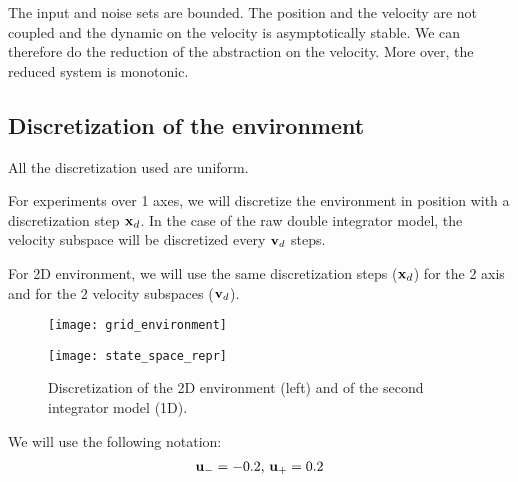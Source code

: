 The input and noise sets are bounded. The position and the velocity are not coupled and the dynamic on the velocity is asymptotically stable.
We can therefore do the reduction of the abstraction on the velocity. More over, the reduced system is monotonic.

\subsection{Discretization of the environment}
All the discretization used are uniform.

For experiments over 1 axes, we will discretize the environment in position with a discretization step $ \mathbf{x}_d$. In the case of the raw double integrator model, the velocity subspace will be discretized every $ \mathbf{v}_d$ steps.

For 2D environment, we will use the same discretization steps ($ \mathbf{x}_d$) for the 2 axis and for the 2 velocity subspaces ($ \mathbf{v}_d$).

\begin{figure}
\centering
\begin{minipage}[b]{0.49\linewidth}
\texttt{[image: grid\_environment]}
\end{minipage}
\begin{minipage}[b]{0.49\linewidth}
\texttt{[image: state\_space\_repr]}
\end{minipage}
\caption{Discretization of the 2D environment (left) and of the second integrator model (1D).}
\end{figure}

We will use the following notation:
\begin{equation}
\begin{split}
 \mathbf{u}_{-} = -0.2
\textrm{, }
 \mathbf{u}_{+} = 0.2
\end{split}
\end{equation}
